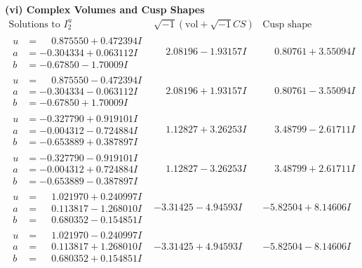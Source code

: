 \documentclass[1p]{elsarticle_modified}
\theoremstyle{definition}
\newcommand{\I}{\sqrt{-1}}
\begin{document}
\newpage\flushleft \textbf{(vi) Complex Volumes and Cusp Shapes}
$$\begin{array}{c|c|c}  
\text{Solutions to }I^u_{2}& \I (\text{vol} + \sqrt{-1}CS) & \text{Cusp shape}\\
 \hline 
\begin{aligned}
u &= \phantom{-}0.875550 + 0.472394 I \\
a &= -0.304334 + 0.063112 I \\
b &= -0.67850 - 1.70009 I\end{aligned}
 & \phantom{-}2.08196 - 1.93157 I & \phantom{-}0.80761 + 3.55094 I \\ \hline\begin{aligned}
u &= \phantom{-}0.875550 - 0.472394 I \\
a &= -0.304334 - 0.063112 I \\
b &= -0.67850 + 1.70009 I\end{aligned}
 & \phantom{-}2.08196 + 1.93157 I & \phantom{-}0.80761 - 3.55094 I \\ \hline\begin{aligned}
u &= -0.327790 + 0.919101 I \\
a &= -0.004312 - 0.724884 I \\
b &= -0.653889 + 0.387897 I\end{aligned}
 & \phantom{-}1.12827 + 3.26253 I & \phantom{-}3.48799 - 2.61711 I \\ \hline\begin{aligned}
u &= -0.327790 - 0.919101 I \\
a &= -0.004312 + 0.724884 I \\
b &= -0.653889 - 0.387897 I\end{aligned}
 & \phantom{-}1.12827 - 3.26253 I & \phantom{-}3.48799 + 2.61711 I \\ \hline\begin{aligned}
u &= \phantom{-}1.021970 + 0.240997 I \\
a &= \phantom{-}0.113817 - 1.268010 I \\
b &= \phantom{-}0.680352 - 0.154851 I\end{aligned}
 & -3.31425 - 4.94593 I & -5.82504 + 8.14606 I \\ \hline\begin{aligned}
u &= \phantom{-}1.021970 - 0.240997 I \\
a &= \phantom{-}0.113817 + 1.268010 I \\
b &= \phantom{-}0.680352 + 0.154851 I\end{aligned}
 & -3.31425 + 4.94593 I & -5.82504 - 8.14606 I \\ \hline\begin{aligned}

\end{aligned}
\end{array}$$
\end{document}
